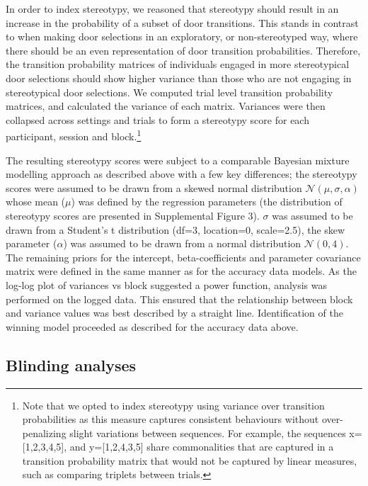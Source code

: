 \documentclass[
  man]{apa6}
\begin{document}
In order to index stereotypy, we reasoned that stereotypy should result in an increase in the probability of a subset of door transitions. This stands in contrast to when making door selections in an exploratory, or non-stereotyped way, where there should be an even representation of door transition probabilities. Therefore, the transition probability matrices of individuals engaged in more stereotypical door selections should show higher variance than those who are not engaging in stereotypical door selections. We computed trial level transition probability matrices, and calculated the variance of each matrix. Variances were then collapsed across settings and trials to form a stereotypy score for each participant, session and block.\footnote{Note that we opted to index stereotypy using variance over transition probabilities as this measure captures consistent behaviours without over-penalizing slight variations between sequences. For example, the sequences x={[}1,2,3,4,5{]}, and y={[}1,2,4,3,5{]} share commonalities that are captured in a transition probability matrix that would not be captured by linear measures, such as comparing triplets between trials.}

The resulting stereotypy scores were subject to a comparable Bayesian mixture modelling approach as described above with a few key differences; the stereotypy scores were assumed to be drawn from a skewed normal distribution \(\mathcal{N}(\mu, \sigma, \alpha)\) whose mean (\(\mu\)) was defined by the regression parameters (the distribution of stereotypy scores are presented in Supplemental Figure 3). \(\sigma\) was assumed to be drawn from a Student's t distribution (df=3, location=0, scale=2.5), the skew parameter (\(\alpha\)) was assumed to be drawn from a normal distribution \(\mathcal{N}(0,4)\). The remaining priors for the intercept, beta-coefficients and parameter covariance matrix were defined in the same manner as for the accuracy data models. As the log-log plot of variances vs block suggested a power function, analysis was performed on the logged data. This ensured that the relationship between block and variance values was best described by a straight line. Identification of the winning model proceeded as described for the accuracy data above.

\hypertarget{blinding-analyses}{%
\subsection{Blinding analyses}\label{blinding-analyses}}
\end{document}

